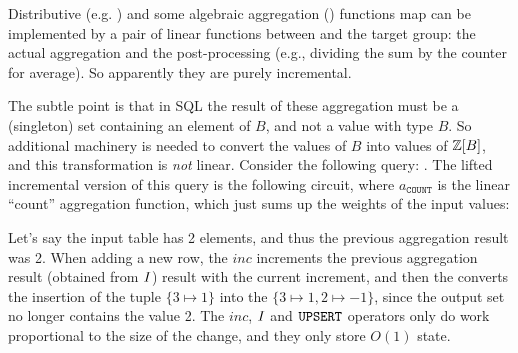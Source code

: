 Distributive (e.g. ) and some algebraic aggregation
() functions map can be implemented by a pair of linear
functions between \zrs and the target group: the actual aggregation
and the post-processing (e.g., dividing the sum by the counter for
average).  So apparently they are purely incremental.

The subtle point is that in SQL the result of these aggregation must
be a (singleton) set containing an element of $B$, and not a value
with type $B$.  So additional machinery is needed to convert the
values of $B$ into values of $\mathbb{Z}[B]$, and this transformation is
\emph{not} linear.  Consider the following query: .  The lifted incremental version of this query is
the following circuit, where $a_\texttt{COUNT}$ is the linear
``count'' aggregation function, which just sums up the weights of the
input values:


Let's say the input table  has 2 elements, and thus the
previous aggregation result was 2.  When adding a new row, the
$\mathit{inc}$ increments the previous aggregation result (obtained
from $\mathit{I}$) result with the current increment, and then the
 converts the insertion of the tuple $\{3 \mapsto 1\}$
into the \zr $\{3 \mapsto 1, 2 \mapsto -1 \}$, since the output set no
longer contains the value 2.  The $\mathit{inc}$, $\mathit{I}$ and $\mbox{\texttt{UPSERT}}$
operators only do work proportional to the size of the change, and
they only store $O(1)$ state.


